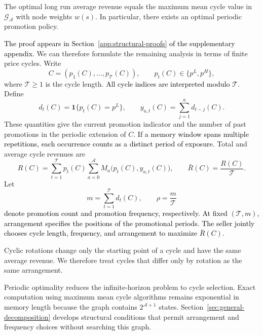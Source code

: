 \begin{proposition}
    \label{thm:cycle}

    The optimal long run average revenue equals the maximum mean cycle value in \(\mathcal G_{\mathcal A}\) with node weights \(w(s)\). In particular, there exists an optimal periodic promotion policy.
\end{proposition}

\textcolor{black}{The proof appears in Section~\ref{app:structural-proofs} of the supplementary appendix.} We can therefore formulate the remaining analysis in terms of finite price cycles. Write
\[
    C=(p_1(C),\ldots,p_{\mathcal T}(C)),
    \qquad p_t(C)\in\{p^L,p^H\},
\]
where \(\mathcal T\geq1\) is the cycle length. \textcolor{black}{All cycle indices are interpreted modulo \(\mathcal T\).} Define
\[
    d_t(C)=\mathbf 1\{p_t(C)=p^L\},
    \qquad y_{a,t}(C)=\sum_{j=1}^{a}d_{t-j}(C).
\]
These quantities give the current promotion indicator and the number of past promotions in the periodic extension of \(C\). \textcolor{black}{If a memory window spans multiple repetitions, each occurrence counts as a distinct period of exposure.} Total and average cycle revenues are
\[
    R(C)=\sum_{t=1}^{\mathcal T}p_t(C)\sum_{a=0}^{\mathcal A}
    M_a\bigl(p_t(C),y_{a,t}(C)\bigr),
    \qquad \bar R(C)=\frac{R(C)}{\mathcal T}.
\]
Let
\[
    m=\sum_{t=1}^{\mathcal T}d_t(C),
    \qquad \rho=\frac{m}{\mathcal T}
\]
\textcolor{black}{denote promotion count and promotion frequency, respectively. At fixed \((\mathcal T,m)\), arrangement specifies the positions of the promotional periods. The seller jointly chooses cycle length, frequency, and arrangement to maximize \(\bar R(C)\).}

Cyclic rotations change only the starting point of a cycle and have the same average revenue. We therefore treat cycles that differ only by rotation as the same arrangement.

\begingroup\color{black}
Periodic optimality reduces the infinite-horizon problem to cycle selection. Exact computation using maximum mean cycle algorithms \citep{karp1978} remains exponential in memory length because the graph contains \(2^{\mathcal A+1}\) states. Section~\ref{sec:general-decomposition} develops structural conditions that permit arrangement and frequency choices without searching this graph.
\par\endgroup
